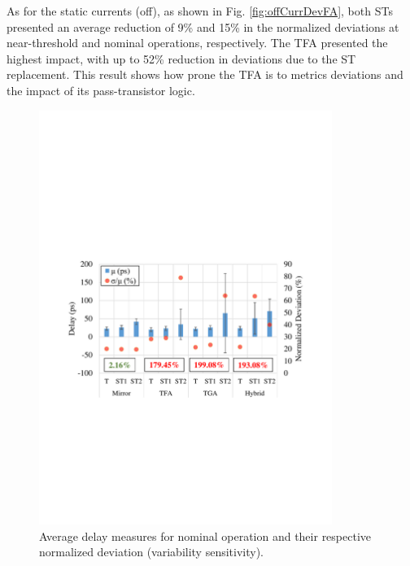 \documentclass[diss,pgmicro,english]{iiufrgs}
\begin{document}
As for the static currents (off), as shown in Fig. \ref{fig:offCurrDevFA}, both STs presented an average reduction of 9\% and 15\% in the normalized deviations at near-threshold and nominal operations, respectively. The TFA presented the highest impact, with up to 52\% reduction in deviations due to the ST replacement. This result shows how prone the TFA is to metrics deviations and the impact of its pass-transistor logic.

\begin{figure}[h]
  \centering
    \includegraphics[width=0.85\textwidth, trim={2cm 10cm 2cm 10.5cm}, clip]{averageDelayNominal.pdf}
     \caption{Average delay measures for nominal operation and their respective normalized deviation (variability sensitivity).}
  \label{fig:avgDelayNominal}
\end{figure}

\vspace{-1em}
\end{document}
